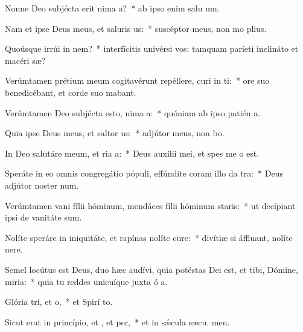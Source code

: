 \item Nonne Deo subjécta erit nima a?~* ab ipso enim salu um.
\item Nam et ipse Deus meus, et saluris us:~* suscéptor meus, non mo plius.
\item Quoúsque irrúi in nem?~* interfícitis univérsi vos: tamquam paríeti inclináto et macéri sæ?
\item Verúmtamen prétium meum cogitavérunt repéllere, curi in ti:~* ore suo benedicébant, et corde suo mabant.
\item Verúmtamen Deo subjécta esto, nima a:~* quóniam ab ipso patién a.
\item Quia ipse Deus meus, et saltor us:~* adjútor meus, non bo.
\item In Deo salutáre meum, et ria a:~* Deus auxílii mei, et spes me  o est.
\item Speráte in eo omnis congregátio pópuli, effúndite coram illo da tra:~* Deus adjútor noster  num.
\item Verúmtamen vani fílii hóminum, mendáces fílii hóminum  staris:~* ut decípiant ipsi de vanitáte  sum.
\item Nolíte speráre in iniquitáte, et rapínas nolíte cure:~* divítiæ si áffluant, nolíte  nere.
\item Semel locútus est Deus, duo hæc audívi, quia potéstas Dei est, et tibi, Dómine, miria:~* quia tu reddes unicuíque juxta ó a.
\item Glória tri, et o,~* et Spirí to.
\item Sicut erat in princípio, et , et per,~* et in sǽcula sæcu. men.
